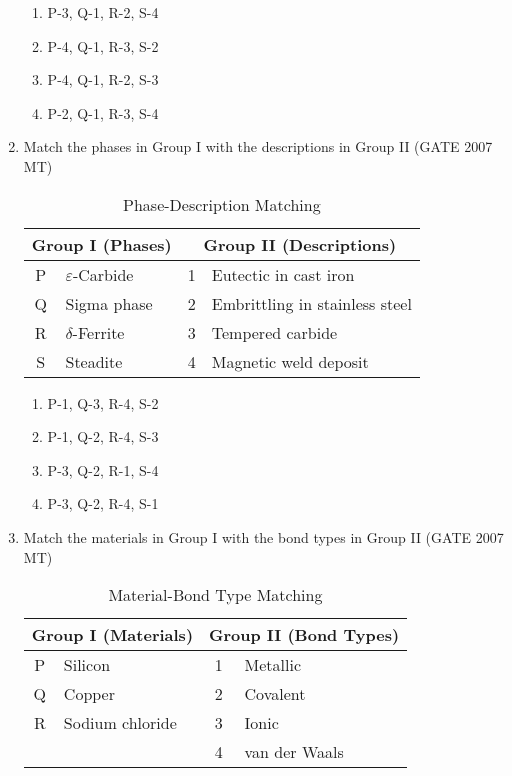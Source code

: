 \documentclass[12pt]{article}
\begin{document}
\begin{enumerate}
  \begin{enumerate}[label=(\Alph*)]
    \item P-3, Q-1, R-2, S-4
    \item P-4, Q-1, R-3, S-2
    \item P-4, Q-1, R-2, S-3
    \item P-2, Q-1, R-3, S-4
  \end{enumerate}


\item Match the phases in Group I with the descriptions in Group II (GATE 2007 MT)\\[1ex]
\begin{table}[h!]
\centering
\caption{Phase-Description Matching}
\label{tab:q46_matching}
\begin{tabular}{|c|l||c|l|}
\hline
\multicolumn{2}{|c||}{\textbf{Group I (Phases)}} & \multicolumn{2}{c|}{\textbf{Group II (Descriptions)}} \\
\hline
P & $\varepsilon$-Carbide         & 1 & Eutectic in cast iron \\
Q & Sigma phase                   & 2 & Embrittling in stainless steel \\
R & $\delta$-Ferrite              & 3 & Tempered carbide \\
S & Steadite                      & 4 & Magnetic weld deposit \\
\hline
\end{tabular}
\end{table}

  \begin{enumerate}[label=(\Alph*)]
    \item P-1, Q-3, R-4, S-2
    \item P-1, Q-2, R-4, S-3
    \item P-3, Q-2, R-1, S-4
    \item P-3, Q-2, R-4, S-1
  \end{enumerate}


\item Match the materials in Group I with the bond types in Group II (GATE 2007 MT)\\[1ex]
\begin{table}[h!]
\centering
\caption{Material-Bond Type Matching}
\label{tab:q47_matching}
\begin{tabular}{|c|l||c|l|}
\hline
\multicolumn{2}{|c||}{\textbf{Group I (Materials)}} & \multicolumn{2}{c|}{\textbf{Group II (Bond Types)}} \\
\hline
P & Silicon          & 1 & Metallic \\
Q & Copper           & 2 & Covalent \\
R & Sodium chloride  & 3 & Ionic \\
  &                  & 4 & van der Waals \\
\hline
\end{tabular}
\end{table}


\end{enumerate}
\end{document}
